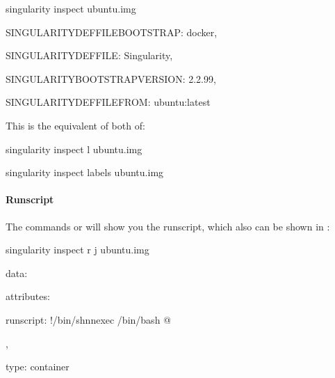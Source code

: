 \documentclass[letterpaper,10pt,english]{sphinxmanual}
\begin{document}
%
\begin{sphinxVerbatim}[commandchars=\\\{\}]
\PYGZdl{} singularity inspect ubuntu.img

\PYGZob{}

    \PYGZdq{}SINGULARITY\PYGZus{}DEFFILE\PYGZus{}BOOTSTRAP\PYGZdq{}: \PYGZdq{}docker\PYGZdq{},

    \PYGZdq{}SINGULARITY\PYGZus{}DEFFILE\PYGZdq{}: \PYGZdq{}Singularity\PYGZdq{},

    \PYGZdq{}SINGULARITY\PYGZus{}BOOTSTRAP\PYGZus{}VERSION\PYGZdq{}: \PYGZdq{}2.2.99\PYGZdq{},

    \PYGZdq{}SINGULARITY\PYGZus{}DEFFILE\PYGZus{}FROM\PYGZdq{}: \PYGZdq{}ubuntu:latest\PYGZdq{}

\PYGZcb{}
\end{sphinxVerbatim}

This is the equivalent of both of:

%
\begin{sphinxVerbatim}[commandchars=\\\{\}]
\PYGZdl{} singularity inspect \PYGZhy{}l ubuntu.img

\PYGZdl{} singularity inspect \PYGZhy{}\PYGZhy{}labels ubuntu.img
\end{sphinxVerbatim}


\paragraph{Runscript}
\label{\detokenize{appendix:runscript}}
The commands  or  will show you the runscript, which also can be shown in :

%
\begin{sphinxVerbatim}[commandchars=\\\{\}]
\PYGZdl{} singularity inspect \PYGZhy{}r \PYGZhy{}j ubuntu.img\PYGZob{}

    \PYGZdq{}data\PYGZdq{}: \PYGZob{}

        \PYGZdq{}attributes\PYGZdq{}: \PYGZob{}

            \PYGZdq{}runscript\PYGZdq{}: \PYGZdq{}\PYGZsh{}!/bin/sh\PYGZbs{}n\PYGZbs{}nexec /bin/bash \PYGZbs{}\PYGZdq{}\PYGZdl{}@\PYGZbs{}\PYGZdq{}\PYGZdq{}

        \PYGZcb{},

        \PYGZdq{}type\PYGZdq{}: \PYGZdq{}container\PYGZdq{}

    \PYGZcb{}

\PYGZcb{}
\end{sphinxVerbatim}
\end{document}
